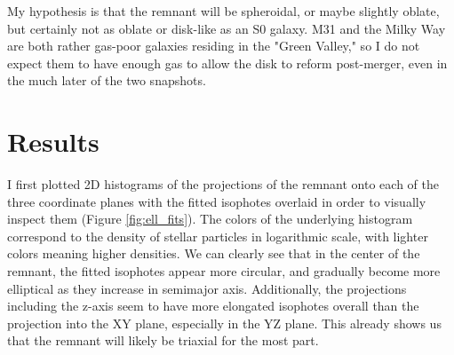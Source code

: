 \documentclass[twocolumn]{aastex631}
\begin{document}
My hypothesis is that the remnant will be spheroidal, or maybe slightly oblate, but certainly not as oblate or disk-like as an S0 galaxy. 
M31 and the Milky Way are both rather gas-poor galaxies residing in the "Green Valley," so I do not expect them to have enough gas to allow the disk to reform post-merger, even in the much later of the two snapshots.


\section{Results}

I first plotted 2D histograms of the projections of the remnant onto each of the three coordinate planes with the fitted isophotes overlaid in order to visually inspect them (Figure \ref{fig:ell_fits}). 
The colors of the underlying histogram correspond to the density of stellar particles in logarithmic scale, with lighter colors meaning higher densities.
We can clearly see that in the center of the remnant, the fitted isophotes appear more circular, and gradually become more elliptical as they increase in semimajor axis. 
Additionally, the projections including the z-axis seem to have more elongated isophotes overall than the projection into the XY plane, especially in the YZ plane.
This already shows us that the remnant will likely be triaxial for the most part.
\end{document}
